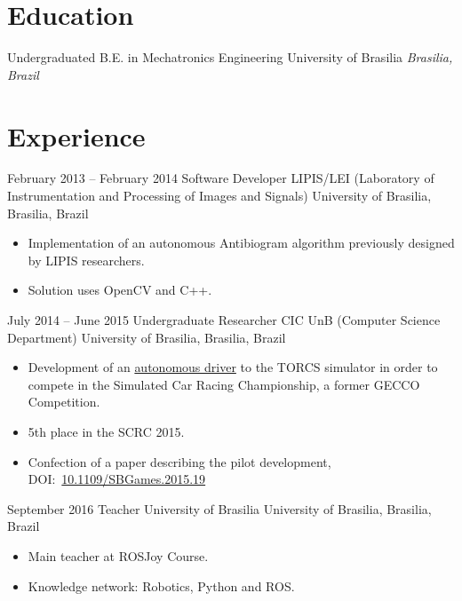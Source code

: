 \documentclass[a4paper, 10pt]{moderncv}        %
\begin{document}
\makecvtitle
\section{Education}
\cventry
{Undergraduated}
{B.E. in Mechatronics Engineering}
{University of Brasilia}
{}
{\textit{Brasilia, Brazil}}
{}
\section{Experience}
\cventry
{February 2013 -- February 2014}
{Software Developer}
{LIPIS/LEI (Laboratory of Instrumentation and Processing of Images and Signals)}
{University of Brasilia, Brasilia, Brazil}
{}
{\begin{itemize}%
    \item Implementation of an autonomous Antibiogram algorithm previously designed by LIPIS researchers.
    \item Solution uses OpenCV and C++.
    \end{itemize}}
\cventry
{July 2014 -- June 2015}
{Undergraduate Researcher}
{CIC UnB (Computer Science Department)}
{University of Brasilia, Brasilia, Brazil}
{}
{\begin{itemize}%
    \item Development of an \href{https://github.com/bruno147/driver-ga}{autonomous driver} to the TORCS simulator in order to compete in the Simulated Car Racing Championship, a former GECCO Competition.
    \item 5th place in the SCRC 2015.
    \item Confection of a paper describing the pilot development, DOI:~\href{https://doi.org/10.1109/SBGames.2015.19}{10.1109/SBGames.2015.19}
    \end{itemize}}
\cventry
{September 2016}
{Teacher}
{University of Brasilia}
{University of Brasilia, Brasilia, Brazil}
{}
{\begin{itemize}%
    \item Main teacher at ROSJoy Course.
    \item Knowledge network: Robotics, Python and ROS.
    \end{itemize}}
\end{document}
